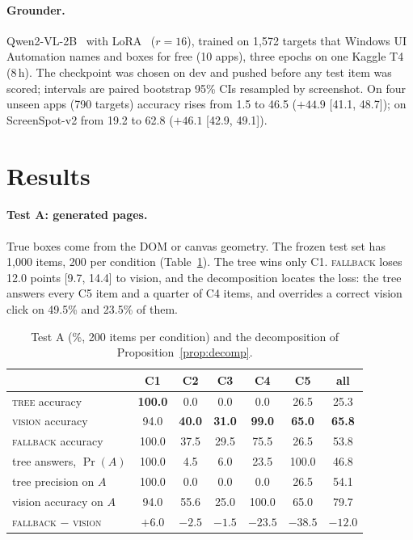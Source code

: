 \documentclass[11pt]{article}
\newcommand{\tree}{\textsc{tree}}
\newcommand{\vis}{\textsc{vision}}
\newcommand{\fb}{\textsc{fallback}}
\begin{document}
\paragraph{Grounder.} Qwen2-VL-2B~\citep{wang2024qwen2vl} with LoRA~\citep{hu2022lora} ($r{=}16$), trained
on 1,572 targets that Windows UI Automation names and boxes for free (10 apps), three epochs on one Kaggle
T4 (8\,h). The checkpoint was chosen on dev and pushed before any test item was scored; intervals are
paired bootstrap 95\% CIs resampled by screenshot. On four unseen apps (790 targets) accuracy rises from 1.5
to 46.5 ($+44.9$ [41.1, 48.7]); on ScreenSpot-v2 from 19.2 to 62.8 ($+46.1$ [42.9, 49.1]).

\section{Results}

\paragraph{Test A: generated pages.} True boxes come from the DOM or canvas geometry. The frozen test set
has 1,000 items, 200 per condition (Table~\ref{tab:a}). The tree wins only C1. \fb{} loses 12.0 points
[9.7, 14.4] to vision, and the decomposition locates the loss: the tree answers every C5 item and a quarter
of C4 items, and overrides a correct vision click on 49.5\% and 23.5\% of them.

\begin{table}[t]
\centering\small
\begin{tabular}{lcccccc}
\toprule
& C1 & C2 & C3 & C4 & C5 & all \\
\midrule
\tree{} accuracy & \textbf{100.0} & 0.0 & 0.0 & 0.0 & 26.5 & 25.3 \\
\vis{} accuracy & 94.0 & \textbf{40.0} & \textbf{31.0} & \textbf{99.0} & \textbf{65.0} & \textbf{65.8} \\
\fb{} accuracy & 100.0 & 37.5 & 29.5 & 75.5 & 26.5 & 53.8 \\
\midrule
tree answers, $\Pr(A)$ & 100.0 & 4.5 & 6.0 & 23.5 & 100.0 & 46.8 \\
tree precision on $A$ & 100.0 & 0.0 & 0.0 & 0.0 & 26.5 & 54.1 \\
vision accuracy on $A$ & 94.0 & 55.6 & 25.0 & 100.0 & 65.0 & 79.7 \\
\fb{} $-$ \vis{} & $+6.0$ & $-2.5$ & $-1.5$ & $-23.5$ & $-38.5$ & $-12.0$ \\
\bottomrule
\end{tabular}
\caption{Test A (\%, 200 items per condition) and the decomposition of Proposition~\ref{prop:decomp}.}
\label{tab:a}
\end{table}
\end{document}
